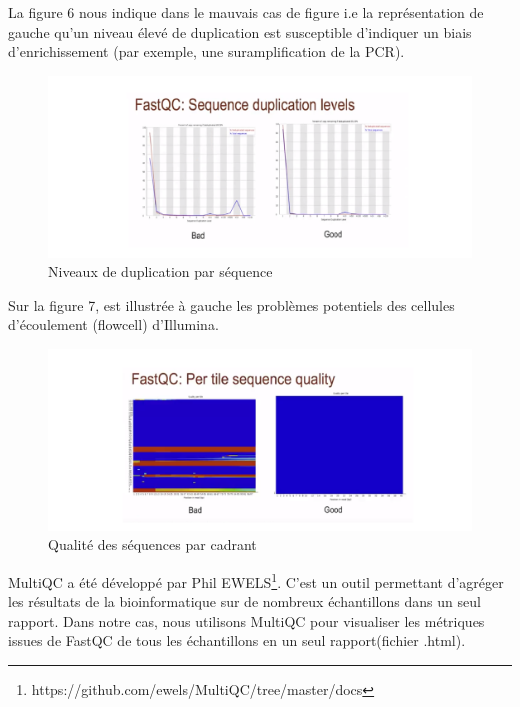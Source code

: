 \documentclass[a4paper,11pt]{article}
\begin{document}
La figure 6 nous indique dans le mauvais cas de figure i.e la
représentation de gauche qu'un niveau élevé de duplication est
susceptible d'indiquer un biais d'enrichissement (par exemple, une
suramplification de la PCR).

\begin{figure}
  \begin{center}
    \includegraphics[width=16cm]{Images/Fastqc_Plots6}
  \end{center}
  \caption{Niveaux de duplication par séquence}
  \label{fig-Fastqc_Plots6}
\end{figure}

Sur la figure 7, est illustrée à gauche les problèmes potentiels des cellules d'écoulement (flowcell) d'Illumina.

\begin{figure}
  \begin{center}
    \includegraphics[width=16cm]{Images/Fastqc_Plots7}
  \end{center}
  \caption{Qualité des séquences par cadrant}
  \label{fig-Fastqc_Plots7}
\end{figure}


\newpage

MultiQC a été développé par Phil
EWELS\footnote{{https://github.com/ewels/MultiQC/tree/master/docs}}. C'est
un outil permettant d’agréger les résultats de la bioinformatique sur
de nombreux échantillons dans un seul rapport. Dans notre cas, nous
utilisons MultiQC pour visualiser les métriques issues de FastQC de tous les
échantillons en un seul rapport(fichier .html).
\end{document}
